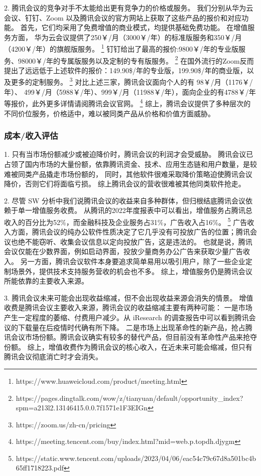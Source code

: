 \documentclass[a4paper,12pt]{article}
\begin{document}
    2.
    腾讯会议的竞争对手不太能给出更有竞争力的价格或服务。
    我们分别从华为云会议、钉钉、Zoom 以及腾讯会议的官方网站上获取了这些产品的报价和对应功能。
    首先，它们均采用了免费增值的商业模式，均提供基础免费功能。
    在增值服务方面，
    华为云会议提供了250￥/月（3000￥/年）的标准版服务和350￥/月（4200￥/年）的旗舰版服务。
    \footnote{https://www.huaweicloud.com/product/meeting.html}
    钉钉给出了最高的报价:9800￥/年的专业版服务、98000￥/年的专属版服务以及定制的专有版服务。
    \footnote{https://pages.dingtalk.com/wow/z/tianyuan/default/opportunity\_index?spm=a213l2.13146415.0.0.7f1571e1F3EIGn}
    在国外流行的Zoom反而提出了远远低于上述软件的报价：149.90\$/年的专业版，199.90\$/年的商业版，以及更多的定制服务。
    \footnote{https://zoom.us/zh-cn/pricing}
    对比上述三家，腾讯会议面向个人的有 98￥/月（1176￥/年）、 499￥/月（5988￥/年）、999￥/月（11988￥/年），面向企业的有4788￥/年等报价，此外更多详情请阅腾讯会议官网。
    \footnote{https://meeting.tencent.com/buy/index.html?mid=web.p.topdh.djygm}
    综上，腾讯会议提供了多种层次的不同价位服务，价格适中，难以被同类产品从价格和价值方面威胁。

    \subsubsection{成本/收入评估}
    1.
    只有当市场份额减少或被迫降价时，腾讯会议的利润才会受威胁。
    腾讯会议已占领了国内市场的大量份额，依靠腾讯资金、技术、应用生态链和用户数量，是较难被同类产品撬走市场份额的，
    同时，其他软件很难采取降价策略迫使腾讯会议降价，否则它们将面临亏损。
    综上腾讯会议的营收很难被其他同类软件抢走。


    2.
    尽管 SW 分析中我们说腾讯会议的收益来自多种群体，但归根结底腾讯会议依赖于单一增值服务收费。
    从腾讯的2022年度报表中可以看出，增值服务占腾讯总收入的百分比为52\%，而金融科技及企业服务占31\%，广告收入占16\%。
    \footnote{https://static.www.tencent.com/uploads/2023/04/06/eac54c79c67d8a501bc4b65ff1718223.pdf}
    广告收入方面，腾讯会议的纯办公软件性质决定了它几乎没有可投放广告的位置；腾讯会议也绝不能窃听、收集会议信息以定向投放广告，这是违法的。
    也就是说，腾讯会议仅能在少数界面，例如启动界面，投放少量商务办公广告来获取少量广告收入。
    另一方面，腾讯会议软件本身要追求简单易用以吸引用户，除了一些企业定制场景外，提供技术支持服务营收的机会也不多。
    综上，增值服务仍是腾讯会议所能依靠的主要收入来源。

    3.
    腾讯会议未来可能会出现收益缩减，但不会出现收益来源会消失的情景。
    增值收费是腾讯会议主要收入来源，腾讯会议的收益缩减主要有两种可能：
    一是市场产生一定程度的萎缩、付费用户减少。从 iResearch 的调查报告中可以看到腾讯会议的下载量在后疫情时代确有所下降。
    二是市场上出现革命性的新产品，抢占腾讯会议市场份额。腾讯会议确实有较多的替代产品，但目前没有革命性产品来抢夺份额。
    综上，增值收费作为腾讯会议的核心收入，在近未来可能会缩减，但只有腾讯会议彻底消亡时才会消失。
\end{document}
